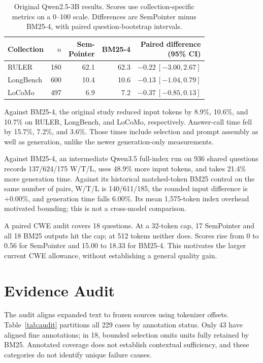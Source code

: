 \documentclass[pdflatex,sn-mathphys-num]{sn-jnl}
\begin{document}
\begingroup
\renewcommand{\tablebodyfont}{\normalsize}
\renewcommand{\tablecaptionfont}{\small}
\begin{table}[!htbp]\centering
\caption{Original Qwen2.5-3B results. Scores use collection-specific metrics on a 0--100 scale. Differences are SemPointer minus BM25-4, with paired question-bootstrap intervals.}\label{tab:history}
\begin{tabular*}{\linewidth}{@{\extracolsep{\fill}}lrrrr@{}}\toprule
Collection & $n$ & \shortstack{Sem-\\Pointer} & BM25-4 & \shortstack{Paired difference\\(95\% CI)} \\
\midrule
RULER & 180 & 62.1 & 62.3 & $-0.22\ [-3.00,2.67]$ \\
LongBench & 600 & 10.4 & 10.6 & $-0.13\ [-1.04,0.79]$ \\
LoCoMo & 497 & 6.9 & 7.2 & $-0.37\ [-0.85,0.13]$ \\
\bottomrule\end{tabular*}\end{table}
\endgroup

Against BM25-4, the original study reduced input tokens by 8.9\%, 10.6\%, and 10.7\% on RULER, LongBench, and LoCoMo, respectively. Answer-call time fell by 15.7\%, 7.2\%, and 3.6\%. Those times include selection and prompt assembly as well as generation, unlike the newer generation-only measurements.

Against BM25-4, an intermediate Qwen3.5 full-index run on 936 shared questions records 137/624/175 W/T/L, uses 48.9\% more input tokens, and takes 21.4\% more generation time. Against its historical matched-token BM25 control on the same number of pairs, W/T/L is 140/611/185, the rounded input difference is $+0.00\%$, and generation time falls 6.00\%. Its mean 1,575-token index overhead motivated bounding; this is not a cross-model comparison.

A paired CWE audit covers 18 questions. At a 32-token cap, 17 SemPointer and all 18 BM25 outputs hit the cap; at 512 tokens neither does. Scores rise from 0 to 0.56 for SemPointer and 15.00 to 18.33 for BM25-4. This motivates the larger current CWE allowance, without establishing a general quality gain.
\section{Evidence Audit}
The audit aligns expanded text to frozen sources using tokenizer offsets. Table~\ref{tab:audit} partitions all 229 cases by annotation status. Only 43 have aligned fine annotations; in 18, bounded selection omits units fully retained by BM25. Annotated coverage does not establish contextual sufficiency, and these categories do not identify unique failure causes.
\end{document}
